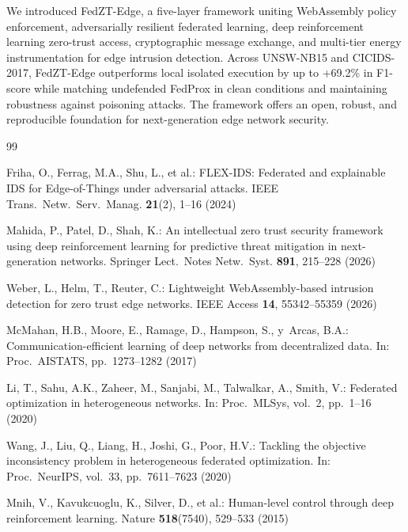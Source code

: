 \documentclass[sn-mathphys,Numbered]{sn-jnl}
\begin{document}
We introduced FedZT-Edge, a five-layer framework uniting WebAssembly policy enforcement, adversarially resilient federated learning, deep reinforcement learning zero-trust access, cryptographic message exchange, and multi-tier energy instrumentation for edge intrusion detection. Across UNSW-NB15 and CICIDS-2017, FedZT-Edge outperforms local isolated execution by up to +69.2\% in F1-score while matching undefended FedProx in clean conditions and maintaining robustness against poisoning attacks. The framework offers an open, robust, and reproducible foundation for next-generation edge network security.

\begin{thebibliography}{99}

Friha, O., Ferrag, M.A., Shu, L., et al.:
FLEX-IDS: Federated and explainable IDS for Edge-of-Things under adversarial attacks.
IEEE Trans.\ Netw.\ Serv.\ Manag. \textbf{21}(2), 1--16 (2024)

Mahida, P., Patel, D., Shah, K.:
An intellectual zero trust security framework using deep reinforcement learning for predictive threat mitigation in next-generation networks.
Springer Lect.\ Notes Netw.\ Syst. \textbf{891}, 215--228 (2026)

Weber, L., Helm, T., Reuter, C.:
Lightweight WebAssembly-based intrusion detection for zero trust edge networks.
IEEE Access \textbf{14}, 55342--55359 (2026)

McMahan, H.B., Moore, E., Ramage, D., Hampson, S., y~Arcas, B.A.:
Communication-efficient learning of deep networks from decentralized data.
In: Proc.\ AISTATS, pp.\ 1273--1282 (2017)

Li, T., Sahu, A.K., Zaheer, M., Sanjabi, M., Talwalkar, A., Smith, V.:
Federated optimization in heterogeneous networks.
In: Proc.\ MLSys, vol.~2, pp.\ 1--16 (2020)

Wang, J., Liu, Q., Liang, H., Joshi, G., Poor, H.V.:
Tackling the objective inconsistency problem in heterogeneous federated optimization.
In: Proc.\ NeurIPS, vol.~33, pp.\ 7611--7623 (2020)

Mnih, V., Kavukcuoglu, K., Silver, D., et al.:
Human-level control through deep reinforcement learning.
Nature \textbf{518}(7540), 529--533 (2015)


\end{thebibliography}
\end{document}
